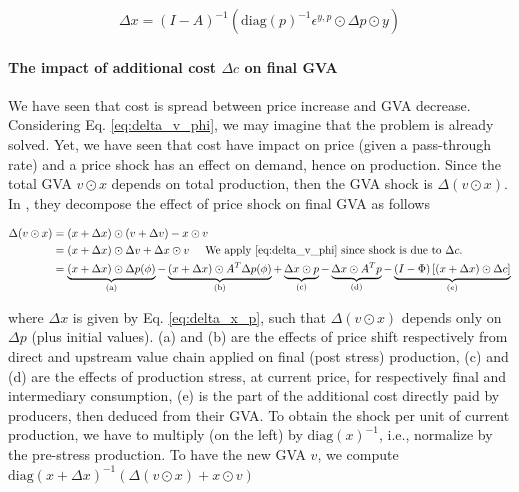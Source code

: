 \documentclass{article}
\begin{document}
\begin{align}
    \Delta x = (I - A)^{-1} \left( \text{diag}(p)^{-1} \epsilon^{y,p} \odot \Delta p \odot y \right)
\label{eq:delta_x_p}
\end{align}


\paragraph{The impact of additional cost $\Delta c$ on final GVA} We have seen that cost is spread between price increase and GVA decrease. Considering Eq. \eqref{eq:delta_v_phi}, we may imagine that the problem is already solved. Yet, we have seen that cost have impact on price (given a pass-through rate) and a price shock has an effect on demand, hence on production. Since the total GVA $v \odot x$ depends on total production, then the GVA shock is $\Delta (v \odot x)$. In \cite{desnos2023climate}, they decompose the effect of price shock on final GVA as follows

\begin{align}
   \Delta (v \odot x) & = (x + \Delta x) \odot (v + \Delta v) - x \odot v \label{eq:delta_xv}
   \\
     & = (x + \Delta x) \odot \Delta v + \Delta x \odot v \hspace{0.5cm} \text{We apply \eqref{eq:delta_v_phi} since shock is due to $\Delta c$.} \nonumber
     \\
     & = \underbrace{(x + \Delta x) \odot \Delta p(\phi)}_{\text{(a)}}
     - \underbrace{(x + \Delta x) \odot A^T \Delta p(\phi)}_{\text{(b)}} 
     + \underbrace{\Delta x \odot p}_{\text{(c)}} 
     - \underbrace{\Delta x \odot A^T p}_{\text{(d)}} - \underbrace{ (I - \Phi) \left[ (x + \Delta x) \odot \Delta c \right]}_{(e)} \nonumber
\end{align}

\noindent where $\Delta x$ is given by Eq. \eqref{eq:delta_x_p}, such that $\Delta (v \odot x)$ depends only on $\Delta p$ (plus initial values). (a) and (b) are the effects of price shift respectively from direct and upstream value chain applied on final (post stress) production, (c) and (d) are the effects of production stress, at current price, for respectively final and intermediary consumption, (e) is the part of the additional cost directly paid by producers, then deduced from their GVA. To obtain the shock per unit of current production, we have to multiply (on the left) by $\text{diag}(x)^{-1}$, i.e., normalize by the pre-stress production. To have the new GVA $v$, we compute $\text{diag}(x + \Delta x)^{-1} \left(\Delta (v \odot x) + x \odot v \right)$
\end{document}
